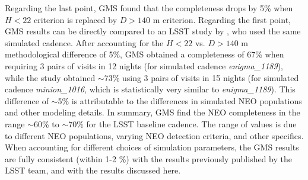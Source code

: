 Regarding the last point, GMS found that the completeness drops by 5\% when $H<22$ criterion is
replaced by $D>140$ m criterion. Regarding  the first point, GMS results can be directly compared to an
LSST study by \cite{JJI2016}, who used the same simulated cadence. After accounting for the $H<22$ vs.
$D>140$ m methodological difference of 5\%, GMS obtained a completeness of 67\% when requiring
3 pairs of visits in 12 nights (for simulated cadence {\it enigma\_1189}), while the \citet{JJI2016}
study obtained $\sim$73\% using 3 pairs of visits in 15 nights (for simulated cadence {\it minion\_1016},
which is statistically very similar to {\it enigma\_1189}). This difference of $\sim$5\% is attributable to
the differences in simulated NEO populations and other modeling details. In summary, GMS find the NEO
completeness in the range $\sim$60\% to $\sim$70\% for the LSST baseline cadence. The range of values
is due to different NEO populations, varying NEO detection criteria, and other specifics. When accounting
for different choices of simulation parameters, the GMS results are fully consistent (within 1-2 \%) with
the results previously published by the LSST team, and with the results discussed here.
